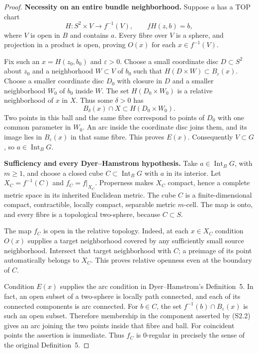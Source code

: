 \begin{proof}
\textbf{Necessity on an entire bundle neighborhood.}\quad
Suppose $a$ has a TOP chart
\[
 H:S^2\times V\longrightarrow f^{-1}(V),\qquad fH(z,b)=b,
\]
where $V$ is open in $B$ and contains $a$. Every fibre over $V$ is a
sphere, and projection in a product is open, proving $O(x)$ for each
$x\in f^{-1}(V)$.

Fix such an $x=H(z_0,b_0)$ and $\varepsilon>0$. Choose a small coordinate
disc $D\subset S^2$ about $z_0$ and a neighborhood $W\subset V$ of
$b_0$ such that $H(D\times W)\subset B_\varepsilon(x)$. Choose a
smaller coordinate disc $D_0$ with closure in $D$ and a smaller
neighborhood $W_0$ of $b_0$ inside $W$. The set $H(D_0\times W_0)$
is a relative neighborhood of $x$ in $X$. Thus some $\delta>0$ has
\[
 B_\delta(x)\cap X\subset H(D_0\times W_0).
\]
Two points in this ball and the same fibre correspond to points of
$D_0$ with one common parameter in $W_0$. An arc inside the coordinate
disc joins them, and its image lies in $B_\varepsilon(x)$ in that
same fibre. This proves $E(x)$. Consequently $V\subset G$, so
$a\in\operatorname{Int}_B G$.

\textbf{Sufficiency and every Dyer--Hamstrom hypothesis.}\quad
Take $a\in\operatorname{Int}_B G$, with $m\ge1$, and choose a closed
cube $C\subset\operatorname{Int}_B G$ with $a$ in its interior.
Let $X_C=f^{-1}(C)$ and $f_C=f|_{X_C}$. Properness makes $X_C$ compact,
hence a complete metric space in its inherited Euclidean metric.
The cube $C$ is a finite-dimensional compact, contractible, locally
compact, separable metric $m$-cell. The map is onto, and every fibre
is a topological two-sphere, because $C\subset S$.

The map $f_C$ is open in the relative topology. Indeed, at each
$x\in X_C$ condition $O(x)$ supplies a target neighborhood covered by
any sufficiently small source neighborhood. Intersect that target
neighborhood with $C$; a preimage of its point automatically belongs
to $X_C$. This proves relative openness even at the boundary of $C$.

Condition $E(x)$ supplies the arc condition in Dyer--Hamstrom's
Definition~5. In fact, an open subset of a two-sphere is locally
path connected, and each of its connected components is arc connected.
For $b\in C$, the set $f^{-1}(b)\cap B_\varepsilon(x)$ is such an open
subset. Therefore membership in the component asserted by (S2.2)
gives an arc joining the two points inside that fibre and ball.
For coincident points the assertion is immediate. Thus $f_C$ is
0-regular in precisely the sense of the original Definition~5.


\end{proof}
